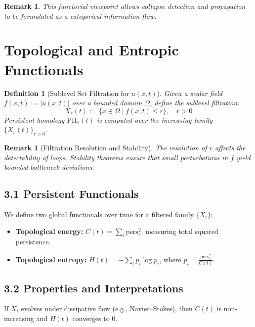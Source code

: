 \documentclass[11pt]{article}
\newtheorem{definition}[theorem]{Definition}
\newtheorem{remark}[theorem]{Remark}
\begin{document}
\begin{remark}
This functorial viewpoint allows collapse detection and propagation to be formulated as a categorical information flow.
\end{remark}


\section{Topological and Entropic Functionals}

\begin{definition}[Sublevel Set Filtration for $u(x,t)$]
Given a scalar field $f(x,t) := |u(x,t)|$ over a bounded domain $\Omega$, define the sublevel filtration:
\[
X_r(t) := \{ x \in \Omega \mid f(x,t) \leq r \}, \quad r > 0
\]
Persistent homology $\mathrm{PH}_1(t)$ is computed over the increasing family $\{ X_r(t) \}_{r > 0}$.
\end{definition}

\begin{remark}[Filtration Resolution and Stability]
The resolution of $r$ affects the detectability of loops. Stability theorems ensure that small perturbations in $f$ yield bounded bottleneck deviations.
\end{remark}

\subsection{3.1 Persistent Functionals}

We define two global functionals over time for a filtered family $\{X_t\}$:
\begin{itemize}
  \item \textbf{Topological energy:} $C(t) = \sum_i \mathrm{pers}_i^2$, measuring total squared persistence.
  \item \textbf{Topological entropy:} $H(t) = -\sum_i p_i \log p_i$, where $p_i = \frac{\mathrm{pers}_i^2}{C(t)}$.
\end{itemize}

\subsection{3.2 Properties and Interpretations}

\begin{lemma}
If $X_t$ evolves under dissipative flow (e.g., Navier–Stokes), then $C(t)$ is non-increasing and $H(t)$ converges to 0.
\end{lemma}
\end{document}

